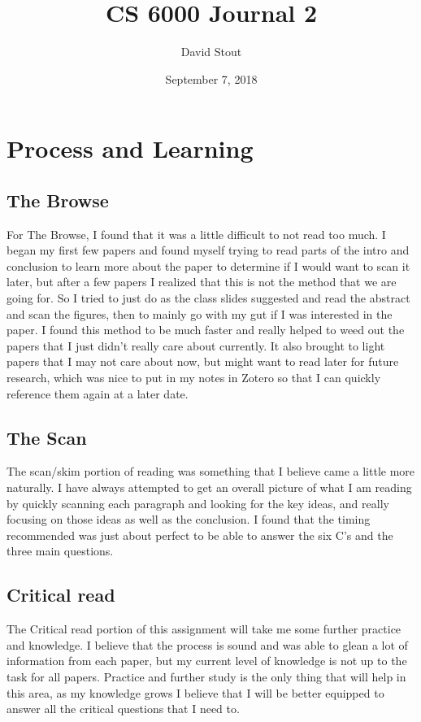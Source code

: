 \documentclass{IEEEtran}
\title{CS 6000 Journal 2}
\author{David Stout}
\date{September 7, 2018}
\begin{document}
\maketitle

\section{Process and Learning}
\subsection{The Browse}
For The Browse, I found that it was a little difficult to not read too much. I began my first few papers 
and found myself trying to read parts of the intro and conclusion to learn more about the paper to 
determine if I would want to scan it later, but after a few papers I realized that this is not the method 
that we are going for. So I tried to just do as the class slides suggested and read the abstract and scan 
the figures, then to mainly go with my gut if I was interested in the paper. I found this method to be much 
faster and really helped to weed out the papers that I just didn't really care about currently. It also 
brought to light papers that I may not care about now, but might want to read later for future research, 
which was nice to put in my notes in Zotero so that I can quickly reference them again at a later date.
\subsection{The Scan}
The scan/skim portion of reading was something that I believe came a little more naturally. I have always 
attempted to get an overall picture of what I am reading by quickly scanning each paragraph and looking for 
the key ideas, and really focusing on those ideas as well as the conclusion. I found that the timing 
recommended was just about perfect to be able to answer the six C's and the three main questions. 
\subsection{Critical read}
The Critical read portion of this assignment will take me some further practice and knowledge. I believe that the 
process is sound and was able to glean a lot of information from each paper, but my current level of knowledge is not 
up to the task for all papers. Practice and further study is the only thing that will help in this area, as my 
knowledge grows I believe that I will be better equipped to answer all the critical questions that I need to.
\end{document}

